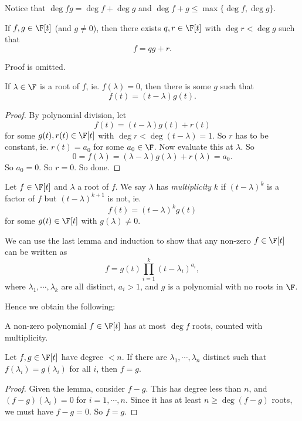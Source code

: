 \documentclass[a4paper]{article}
\begin{document}
Notice that $\deg fg = \deg f + \deg g$ and $\deg f + g \leq \max\{\deg f, \deg g\}$.

\begin{lemma}
  If $f, g \in \F[t]$ (and $g \not= 0$), then there exists $q, r \in \F[t]$ with $\deg r < \deg g$ such that
  \[
    f = qg + r.
  \]
\end{lemma}
Proof is omitted.

\begin{lemma}
  If $\lambda \in \F$ is a root of $f$, ie. $f(\lambda) = 0$, then there is some $g$ such that
  \[
    f(t) = (t - \lambda) g(t).
  \]
\end{lemma}

\begin{proof}
  By polynomial division, let
  \[
    f(t) = (t - \lambda)g(t) + r(t)
  \]
  for some $g(t), r(t) \in \F[t]$ with $\deg r < \deg (t - \lambda) = 1$. So $r$ has to be constant, ie. $r(t) = a_0$ for some $a_0 \in \F$. Now evaluate this at $\lambda$. So
  \[
    0 = f(\lambda) = (\lambda - \lambda)g(\lambda) + r(\lambda) = a_0.
  \]
  So $a_0 = 0$. So $r = 0$. So done.
\end{proof}

\begin{defi}
  Let $f \in \F[t]$ and $\lambda$ a root of $f$. We say $\lambda$ has \emph{multiplicity} $k$ if $(t - \lambda)^k$ is a factor of $f$ but $(t - \lambda)^{k + 1}$ is not, ie.
  \[
    f(t) = (t - \lambda)^k g(t)
  \]
  for some $g(t) \in \F[t]$ with $g(\lambda) \not= 0$.
\end{defi}

We can use the last lemma and induction to show that any non-zero $f \in \F[t]$ can be written as
\[
  f = g(t) \prod_{i = 1}^k (t - \lambda_i)^{a_i},
\]
where $\lambda_1, \cdots, \lambda_k$ are all distinct, $a_i > 1$, and $g$ is a polynomial with no roots in $\F$.

Hence we obtain the following:
\begin{lemma}
  A non-zero polynomial $f \in \F[t]$ has at most $\deg f$ roots, counted with multiplicity.
\end{lemma}

\begin{cor}
  Let $f, g \in \F[t]$ have degree $<n$. If there are $\lambda_1, \cdots, \lambda_n$ distinct such that $f(\lambda_i) = g(\lambda_i)$ for all $i$, then $f = g$.
\end{cor}

\begin{proof}
  Given the lemma, consider $f - g$. This has degree less than $n$, and $(f - g)(\lambda_i) = 0$ for $i = 1, \cdots, n$. Since it has at least $n \geq \deg(f - g)$ roots, we must have $f - g = 0$. So $f = g$.
\end{proof}
\end{document}
